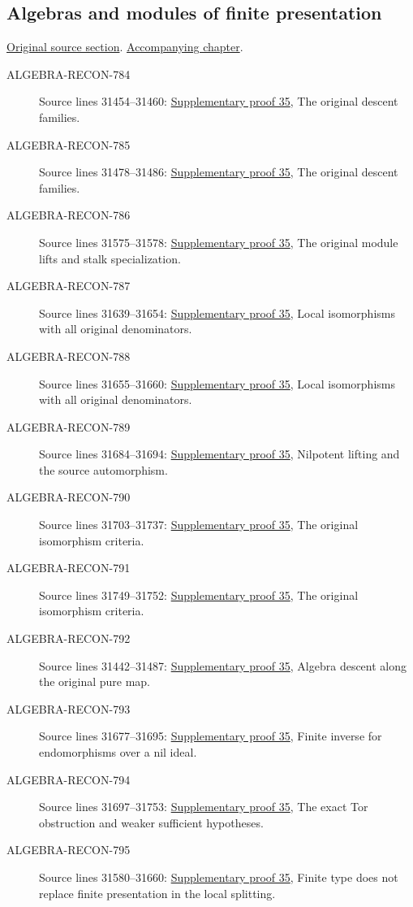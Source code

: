 \subsection{Algebras and modules of finite presentation}
\hypertarget{algebra-source-section-finite-presentation}{}
\noindent\href{https://github.com/stacks/stacks-project/blob/a04446e57ec1fbc252a871afcec7752fb2807b14/algebra.tex\#L31434}{Original source section}. \href{algebra.pdf\#nameddest=section-finite-presentation}{Accompanying chapter}.

\begin{description}
\item[ALGEBRA-RECON-784] Source lines 31454--31460: \hyperlink{algebra_finite_presentation_notes_20260928}{Supplementary proof 35}, The original descent families.
\item[ALGEBRA-RECON-785] Source lines 31478--31486: \hyperlink{algebra_finite_presentation_notes_20260928}{Supplementary proof 35}, The original descent families.
\item[ALGEBRA-RECON-786] Source lines 31575--31578: \hyperlink{algebra_finite_presentation_notes_20260928}{Supplementary proof 35}, The original module lifts and stalk specialization.
\item[ALGEBRA-RECON-787] Source lines 31639--31654: \hyperlink{algebra_finite_presentation_notes_20260928}{Supplementary proof 35}, Local isomorphisms with all original denominators.
\item[ALGEBRA-RECON-788] Source lines 31655--31660: \hyperlink{algebra_finite_presentation_notes_20260928}{Supplementary proof 35}, Local isomorphisms with all original denominators.
\item[ALGEBRA-RECON-789] Source lines 31684--31694: \hyperlink{algebra_finite_presentation_notes_20260928}{Supplementary proof 35}, Nilpotent lifting and the source automorphism.
\item[ALGEBRA-RECON-790] Source lines 31703--31737: \hyperlink{algebra_finite_presentation_notes_20260928}{Supplementary proof 35}, The original isomorphism criteria.
\item[ALGEBRA-RECON-791] Source lines 31749--31752: \hyperlink{algebra_finite_presentation_notes_20260928}{Supplementary proof 35}, The original isomorphism criteria.
\item[ALGEBRA-RECON-792] Source lines 31442--31487: \hyperlink{algebra_finite_presentation_notes_20260928}{Supplementary proof 35}, Algebra descent along the original pure map.
\item[ALGEBRA-RECON-793] Source lines 31677--31695: \hyperlink{algebra_finite_presentation_notes_20260928}{Supplementary proof 35}, Finite inverse for endomorphisms over a nil ideal.
\item[ALGEBRA-RECON-794] Source lines 31697--31753: \hyperlink{algebra_finite_presentation_notes_20260928}{Supplementary proof 35}, The exact Tor obstruction and weaker sufficient hypotheses.
\item[ALGEBRA-RECON-795] Source lines 31580--31660: \hyperlink{algebra_finite_presentation_notes_20260928}{Supplementary proof 35}, Finite type does not replace finite presentation in the local splitting.
\end{description}

